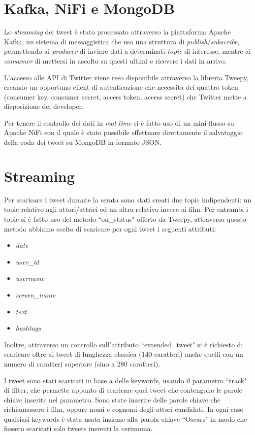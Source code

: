 \documentclass[11pt,a4paper]{report}
\begin{document}
\section{Kafka, NiFi e MongoDB}
Lo \textit{streaming} dei tweet è stato processato attraverso la piattaforma Apache Kafka, un sistema di messaggistica che usa una struttura di \textit{publish}/\textit{subscribe}, permettendo ai \textit{producer} di inviare dati a determinati \textit{topic} di interesse, mentre ai \textit{consumer} di mettersi in ascolto su questi ultimi e ricevere i dati in arrivo. 

L'accesso alle API di Twitter viene reso disponibile attraverso la libreria Tweepy, creando un opportuno client di autenticazione che necessita dei quattro token (consumer key, consumer secret, access token, access secret) che Twitter mette a disposizione dei developer.

Per tenere il controllo dei dati in \textit{real time} si è fatto uso di un mini-flusso su Apache NiFi con il quale è stato possibile effettuare direttamente il salvataggio della coda dei tweet su MongoDB in formato JSON.

\section{Streaming}
Per scaricare i tweet durante la serata sono stati creati due topic indipendenti: un topic relativo agli attori/attrici ed un altro relativo invece ai film. Per entrambi i topic si è fatto uso del metodo “on\_status" offerto da Tweepy, attraverso questo metodo abbiamo scelto di scaricare per ogni tweet i seguenti attributi:
\begin{itemize}
\item \textit{date}
 \item \textit{user\_id}
 \item \textit{username}
 \item \textit{screen\_name}
 \item \textit{text}
 \item \textit{hashtags}
\end{itemize}
Inoltre, attraverso un controllo sull'attributo “extended\_tweet" si è richiesto di scaricare oltre ai tweet di lunghezza classica (140 caratteri) anche quelli con un numero di caratteri superiore (sino a 280 caratteri).

I tweet sono stati scaricati in base a delle keywords, usando il parametro “track" di filter, che permette appunto di scaricare quei tweet che contengono le parole chiave inserite nel parametro. Sono state inserite delle parole chiave che richiamassero i film, oppure nomi e cognomi degli attori candidati. In ogni caso qualsiasi keywords è stata usata insieme alla parola chiave “Oscars" in modo che fossero scaricati solo tweets inerenti la cerimonia.
\end{document}
